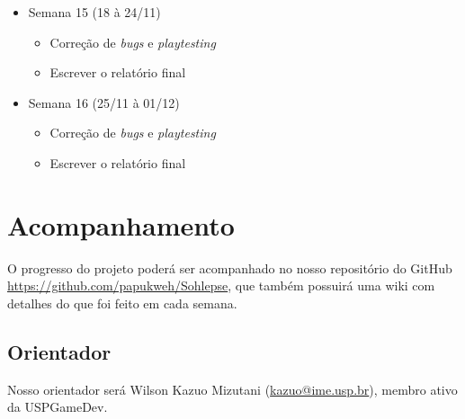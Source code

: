 \documentclass[a4paper, 11pt]{article}
\begin{document}
\begin{itemize}
\item Semana 15 (18 à 24/11)
 \begin{itemize} 
 \item Correção de \textit{bugs} e \textit{playtesting}
 \item Escrever o relatório final
 \end{itemize}

\item Semana 16 (25/11 à 01/12)
 \begin{itemize} 
 \item Correção de \textit{bugs} e \textit{playtesting}
 \item Escrever o relatório final
 \end{itemize}

\end{itemize}

\section{Acompanhamento}
 	O progresso do projeto poderá ser acompanhado no nosso repositório do GitHub \url{https://github.com/papukweh/Sohlepse}, que também possuirá uma wiki com detalhes do que foi feito em cada semana.

 \subsection{Orientador} Nosso orientador será Wilson Kazuo Mizutani (\href{mailto:kazuo@ime.usp.br}{kazuo@ime.usp.br}), membro ativo da USPGameDev.
\end{document}

